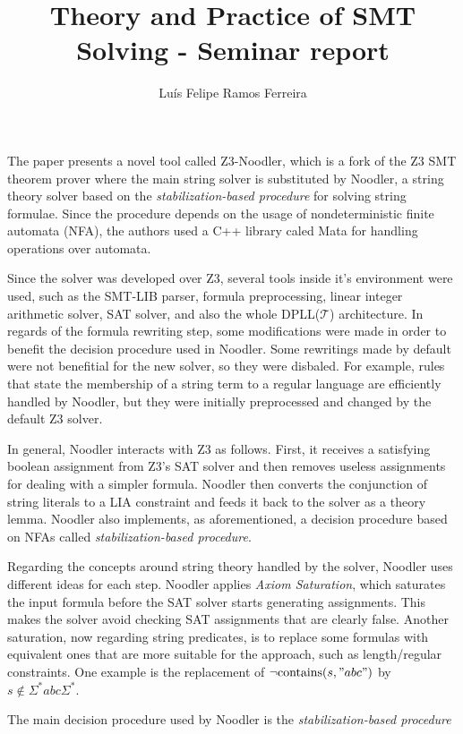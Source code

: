 \documentclass{article}
\title{Theory and Practice of SMT Solving - Seminar report}
\author{Luís Felipe Ramos Ferreira}
\begin{document}
\maketitle

The paper presents a novel tool called Z3-Noodler, which is a fork of the Z3 SMT theorem prover where the main string solver is substituted by
Noodler, a string theory solver based on the \textit{stabilization-based procedure} for solving string formulae. Since the procedure depends on the usage
of nondeterministic finite automata (NFA), the authors used a C++ library caled Mata for handling operations over automata.

Since the solver was developed over Z3, several tools inside it's environment were used, such as the SMT-LIB parser, formula preprocessing, linear integer arithmetic
solver, SAT solver, and also the whole DPLL(\(\mathcal{T}\)) architecture. In regards of the formula rewriting step, some modifications were
made in order to benefit the decision procedure used in Noodler. Some rewritings made by default were not benefitial for the new solver, so they were disbaled.
For example, rules that state the membership of a string term to a regular language are efficiently handled by Noodler, but they were initially preprocessed and changed
by the default Z3 solver.

In general, Noodler interacts with Z3 as follows. First, it receives a satisfying boolean assignment from Z3's SAT solver and then removes
useless assignments for dealing with a simpler formula. Noodler then converts the conjunction of string literals to a LIA constraint and feeds it back
to the solver as a theory lemma. Noodler also implements, as aforementioned, a decision procedure based on NFAs called \textit{stabilization-based procedure}.

Regarding the concepts around string theory handled by the solver, Noodler uses different ideas for each step. Noodler applies \textit{Axiom Saturation}, 
which saturates the input formula before the SAT solver starts generating assignments. This makes the solver avoid checking SAT assignments that are clearly false. Another
saturation, now regarding string predicates, is to replace some formulas with equivalent ones that are more suitable for the approach, such as length/regular
constraints. One example is the replacement of \(\neg\text{contains}(s, "abc")\) by \(s \notin \Sigma^*abc\Sigma^*\). 

The main decision procedure used by Noodler is the \textit{stabilization-based procedure}
\end{document}
